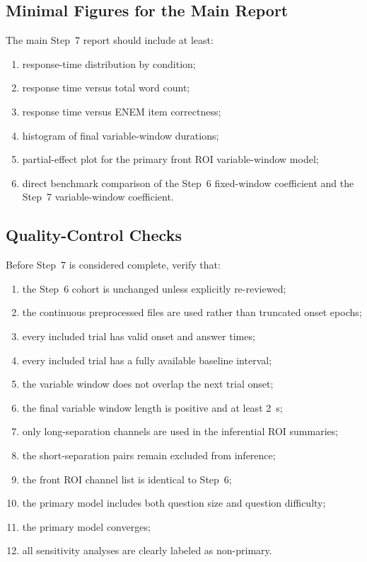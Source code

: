 \documentclass[11pt]{article}
\begin{document}
\subsection{Minimal Figures for the Main Report}
The main Step~7 report should include at least:
\begin{enumerate}
    \item response-time distribution by condition;
    \item response time versus total word count;
    \item response time versus ENEM item correctness;
    \item histogram of final variable-window durations;
    \item partial-effect plot for the primary front ROI variable-window model;
    \item direct benchmark comparison of the Step~6 fixed-window coefficient and the Step~7 variable-window coefficient.
\end{enumerate}

\subsection{Quality-Control Checks}
Before Step~7 is considered complete, verify that:
\begin{enumerate}
    \item the Step~6 cohort is unchanged unless explicitly re-reviewed;
    \item the continuous preprocessed files are used rather than truncated onset epochs;
    \item every included trial has valid onset and answer times;
    \item every included trial has a fully available baseline interval;
    \item the variable window does not overlap the next trial onset;
    \item the final variable window length is positive and at least 2~s;
    \item only long-separation channels are used in the inferential ROI summaries;
    \item the short-separation pairs remain excluded from inference;
    \item the front ROI channel list is identical to Step~6;
    \item the primary model includes both question size and question difficulty;
    \item the primary model converges;
    \item all sensitivity analyses are clearly labeled as non-primary.
\end{enumerate}
\end{document}
